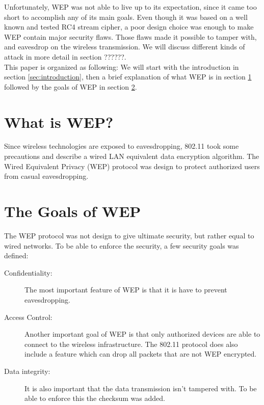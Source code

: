 \documentclass[twocolumn,11pt]{IEEEtran}
\begin{document}
Unfortunately, WEP was not able to live up to its expectation, since it came too short to accomplish any of its main goals. Even though it was based on a well known and tested RC4 stream cipher, a poor design choice was enough to make WEP contain major security flaws. Those flaws made it possible to tamper with, and eavesdrop on the wireless transmission. We will discuss different kinds of attack in more detail in section ??????. \\



This paper is organized as following: We will start with the introduction in 
section \ref{sec:introduction}, then a brief explanation of what WEP is in 
section \ref{sec:whatiswep} followed by the goals of WEP in section \ref{sec:goals}.


\section {What is WEP?}
\label{sec:whatiswep}

Since wireless technologies are exposed to eavesdropping, 802.11 took some precautions and describe a wired LAN equivalent data encryption algorithm. The Wired Equivalent Privacy (WEP) protocol was design to protect authorized users from casual eavesdropping.  



\section {The Goals of WEP}
\label{sec:goals}

The WEP protocol was not design to give ultimate security, but rather equal to wired networks. To be able to enforce the security, a few security goals was defined\cite{IEEE:Fast}:\\

\begin{description}
\item[Confidentiality:] The most important feature of WEP is that it is have to prevent eavesdropping.
\item[Access Control:] Another important goal of WEP is that only authorized devices are able to connect to the wireless infrastructure. The 802.11 protocol does also include a feature which can drop all packets that are not WEP encrypted.
\item[Data integrity:] It is also important that the data transmission isn't tampered with. To be able to enforce this the checksum was added.\\
\end{description}
\end{document}
